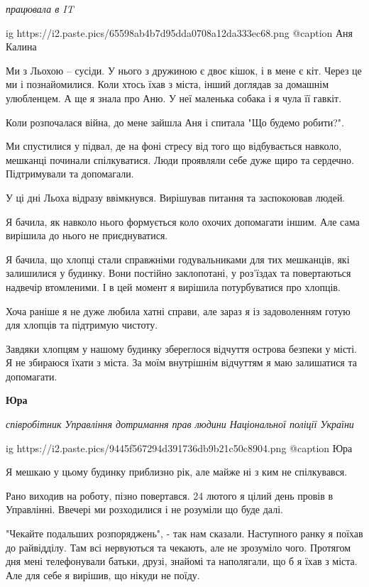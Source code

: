 \begin{multicols}{3}
\emph{працювала в IT}

\ifcmt
  ig https://i2.paste.pics/65598ab4b7d95dda0708a12da333ec68.png
	@caption Аня Калина
\fi

Ми з Льохою – сусіди. У нього з дружиною є двоє кішок, і в мене є кіт. Через це
ми і познайомилися. Коли хтось їхав з міста, інший доглядав за домашнім
улюбленцем. А ще я знала про Аню. У неї маленька собака і я чула її гавкіт.

Коли розпочалася війна, до мене зайшла Аня і спитала "Що будемо робити?".

Ми спустилися у підвал, де на фоні стресу від того що відбувається навколо,
мешканці починали спілкуватися. Люди проявляли себе дуже щиро та сердечно.
Підтримували та допомагали.

У ці дні Льоха відразу ввімкнувся.  Вирішував питання та заспокоював людей.

Я бачила, як навколо нього формується коло охочих допомагати іншим. Але сама
вирішила до нього не приєднуватися.

Я бачила, що хлопці стали справжніми годувальниками для тих мешканців, які
залишилися у будинку. Вони постійно заклопотані, у роз'їздах та повертаються
надвечір втомленими. І в цей момент я вирішила потурбуватися про хлопців.

Хоча раніше я не дуже любила хатні справи, але зараз я із задоволенням готую
для хлопців та підтримую чистоту.

Завдяки хлопцям у нашому будинку збереглося відчуття острова безпеки у місті. Я
не збираюся їхати з міста. За моїм внутрішнім відчуттям я маю залишатися та
допомагати.

\textbf{Юра}

\emph{співробітник Управління дотримання прав людини Національної поліції України}

\ifcmt
  ig https://i2.paste.pics/9445f567294d391736db9b21c50c8904.png
	@caption Юра
\fi

Я мешкаю у цьому будинку приблизно рік, але майже ні з ким не спілкувався.

Рано виходив на роботу, пізно повертався. 24 лютого я цілий день провів в
Управлінні. Ввечері ми розходилися і не розуміли що буде далі.

"Чекайте подальших розпоряджень", - так нам сказали.  Наступного ранку я поїхав
до райвідділу. Там всі нервуються та чекають, але не зрозуміло чого. Протягом
дня мені телефонували батьки, друзі, знайомі та наполягали, що б я їхав з
міста. Але для себе я вирішив, що нікуди не поїду.


\end{multicols}
